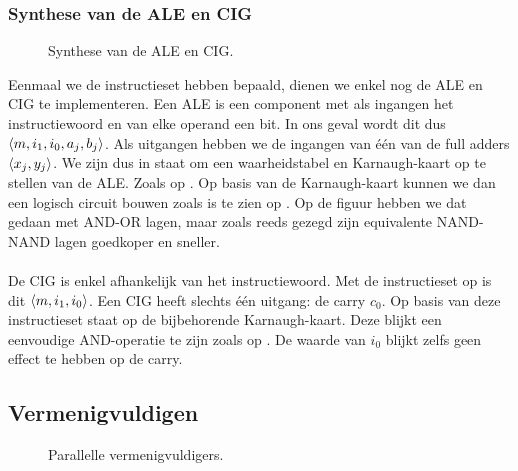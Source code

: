 \subsubsection{Synthese van de ALE en CIG}

\begin{figure}[hbt]
\centering
{}
\caption{Synthese van de ALE en CIG.}
\end{figure}

Eenmaal we de instructieset hebben bepaald, dienen we enkel nog de ALE en CIG te implementeren. Een ALE is een component met als ingangen het instructiewoord en van elke operand een bit. In ons geval wordt dit dus $\left\langle m,i_1,i_0,a_j,b_j \right\rangle$. Als uitgangen hebben we de ingangen van \'e\'en van de full adders $\left\langle x_j,y_j \right\rangle$. We zijn dus in staat om een waarheidstabel en Karnaugh-kaart op te stellen van de ALE. Zoals op . Op basis van de Karnaugh-kaart kunnen we dan een logisch circuit bouwen zoals is te zien op . Op de figuur hebben we dat gedaan met AND-OR lagen, maar zoals reeds gezegd zijn equivalente NAND-NAND lagen goedkoper en sneller.

\paragraph{}
De CIG is enkel afhankelijk van het instructiewoord. Met de instructieset op  is dit $\left\langle m,i_1,i_0 \right\rangle$. Een CIG heeft slechts \'e\'en uitgang: de carry $c_0$. Op basis van deze instructieset staat op  de bijbehorende Karnaugh-kaart. Deze blijkt een eenvoudige AND-operatie te zijn zoals op . De waarde van $i_0$ blijkt zelfs geen effect te hebben op de carry.

\subsection{Vermenigvuldigen}

\begin{figure}[htb]
\centering
{}
\caption{Parallelle vermenigvuldigers.}
\end{figure}

